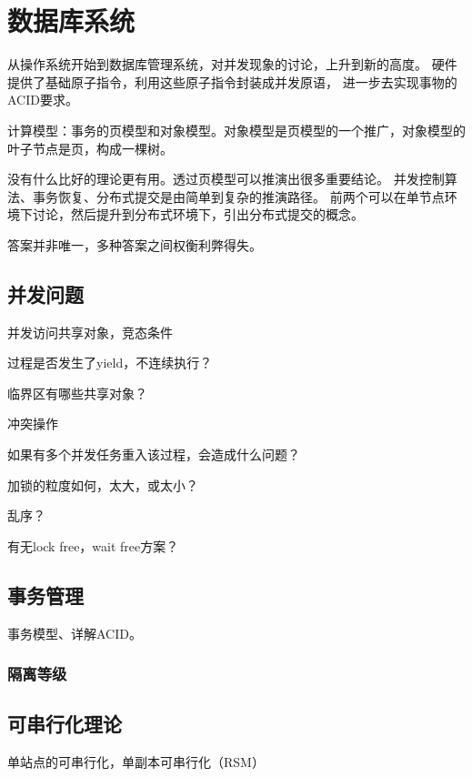\chapter{数据库系统}

从操作系统开始到数据库管理系统，对并发现象的讨论，上升到新的高度。
硬件提供了基础原子指令，利用这些原子指令封装成并发原语，
进一步去实现事物的ACID要求。

计算模型：事务的页模型和对象模型。对象模型是页模型的一个推广，对象模型的叶子节点是页，构成一棵树。

没有什么比好的理论更有用。透过页模型可以推演出很多重要结论。
并发控制算法、事务恢复、分布式提交是由简单到复杂的推演路径。
前两个可以在单节点环境下讨论，然后提升到分布式环境下，引出分布式提交的概念。

答案并非唯一，多种答案之间权衡利弊得失。

\section{并发问题}

并发访问共享对象，竞态条件

\begin{enumbox}
\item 过程是否发生了yield，不连续执行？
\item 临界区有哪些共享对象？
\item 冲突操作
\item 如果有多个并发任务重入该过程，会造成什么问题？
\item 加锁的粒度如何，太大，或太小？
\item 乱序？
\item 有无lock free，wait free方案？
\end{enumbox}

\section{事务管理}

事务模型、详解ACID。

\subsection{隔离等级}

\section{可串行化理论}

单站点的可串行化，单副本可串行化（RSM）

